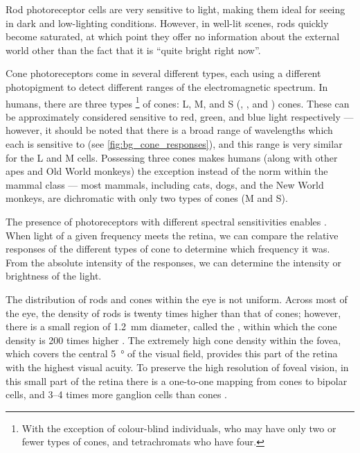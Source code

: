 Rod photoreceptor cells are very sensitive to light, making them ideal for seeing in dark and low-lighting conditions.
However, in well-lit scenes, rods quickly become saturated, at which point they offer no information about the external world other than the fact that it is ``quite bright right now''.

Cone photoreceptors come in several different types, each using a different photopigment to detect different ranges of the electromagnetic spectrum.
In humans, there are three types%
\footnote{With the exception of colour-blind individuals, who may have only two or fewer types of cones, and tetrachromats \citep{Nagy1981,Jordan1993,Jameson2001} who have four.}
of cones:
\acl{L}, \acl{M}, and \acl{S} (, , and ) cones.
These can be approximately considered sensitive to red, green, and blue light respectively --- however, it should be noted that there is a broad range of wavelengths which each is sensitive to (see \autoref{fig:bg_cone_responses}), and this range is very similar for the \ac{L} and \ac{M} cells.
Possessing three cones makes humans (along with other apes and Old World monkeys) the exception instead of the norm within the mammal class --- most mammals, including cats, dogs, and the New World monkeys, are dichromatic with only two types of cones (\ac{M} and \ac{S}).

The presence of photoreceptors with different spectral sensitivities enables .
When light of a given frequency meets the retina, we can compare the relative responses of the different types of cone to determine which frequency it was.
From the absolute intensity of the responses, we can determine the intensity or brightness of the light.

The distribution of rods and cones within the eye is not uniform.
Across most of the eye, the density of rods is twenty times higher than that of cones; however, there is a small region of \SI{1.2}{\milli\metre} diameter, called the , within which the cone density is \num{200} times higher \citep[Chapter~11]{nsbook}.
The extremely high cone density within the fovea, which covers the central \SI{5}{\degree} of the visual field, provides this part of the retina with the highest visual acuity.
To preserve the high resolution of foveal vision, in this small part of the retina there is a one-to-one mapping from cones to bipolar cells, and \numrange{3}{4} times more ganglion cells than cones \citep{Wassle1990}.


